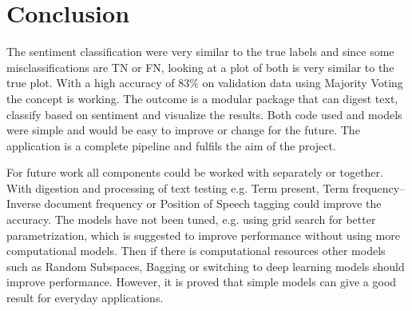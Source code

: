 \chapter{Conclusion}
\label{cha:conclusion}


The sentiment classification were very similar to the true labels and since some misclassifications are TN or FN, looking at a plot of both is very similar to the true plot. 
With a high accuracy of 83\% on validation data using Majority Voting the concept is working. 
The outcome is a modular package that can digest text, classify based on sentiment and visualize the results. 
Both code used and models were simple and would be easy to improve or change for the future. 
The application is a complete pipeline and fulfils the aim of the project.

For future work all components could be worked with separately or together. 
With digestion and processing of text testing e.g. Term present, Term frequency–Inverse document frequency or Position of Speech tagging could improve the accuracy. 
The models have not been tuned, e.g. using grid search for better parametrization, which is suggested to improve performance without using more computational models. 
Then if there is computational resources other models such as Random Subspaces, Bagging or switching to deep learning models should improve performance. 
However, it is proved that simple models can give a good result for everyday applications.